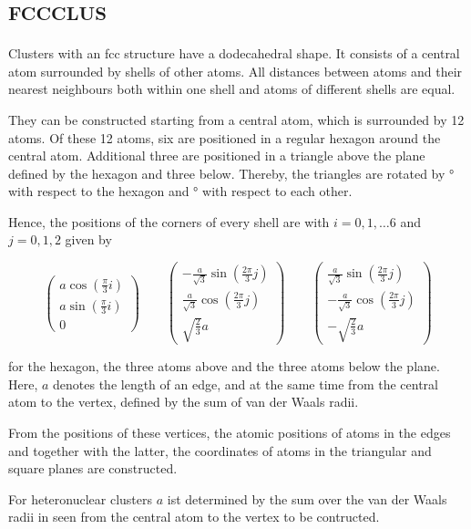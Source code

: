 \section{\textsc{fccclus}}
\label{fccclus}

Clusters with an \ac{fcc} structure have a dodecahedral shape. It consists
of a central atom surrounded by shells of other atoms. All distances 
between atoms and their nearest neighbours both within one shell and atoms
of different shells are equal.

They can be constructed starting from a central atom, which is surrounded by
12 atoms. Of these 12 atoms, six are positioned in a regular hexagon around
the central atom. Additional three are positioned in a triangle above the
plane defined by the hexagon and three below. Thereby, the triangles are rotated
by \unit[30]{\degree} with respect to the hexagon and \unit[60]{\degree}
with respect to each other.

Hence, the positions of the corners of every shell are with $i=0,1,\dots 6$
and $j=0,1,2$ given by

\begin{equation}
 \begin{pmatrix}
  a \cos \left(\frac\pi3 i \right)\\
  a \sin \left(\frac\pi3 i \right)\\
  0
 \end{pmatrix}
 \quad\quad
 \begin{pmatrix}
  -\frac{a}{\sqrt{3}} \sin \left(\frac{2\pi}{3} j \right)\\
   \frac{a}{\sqrt{3}} \cos \left(\frac{2\pi}{3} j \right)\\
  \sqrt{\frac23} a
 \end{pmatrix}
 \quad\quad
 \begin{pmatrix}
   \frac{a}{\sqrt{3}} \sin \left(\frac{2\pi}{3} j \right)\\
  -\frac{a}{\sqrt{3}} \cos \left(\frac{2\pi}{3} j \right)\\
  -\sqrt{\frac23} a
 \end{pmatrix}
\end{equation}

for the hexagon, the three atoms above and the three atoms below the plane.
Here, $a$ denotes the length of an edge, and at the same time from the central
atom to the vertex, defined by the sum of van der Waals
radii.

From the positions of these vertices, the atomic positions of atoms in the
edges and together with the latter, the coordinates of atoms in the triangular
and square planes are constructed.

For heteronuclear clusters $a$ ist determined by the sum over the van der Waals
radii in seen from the central atom to the vertex to be contructed.
